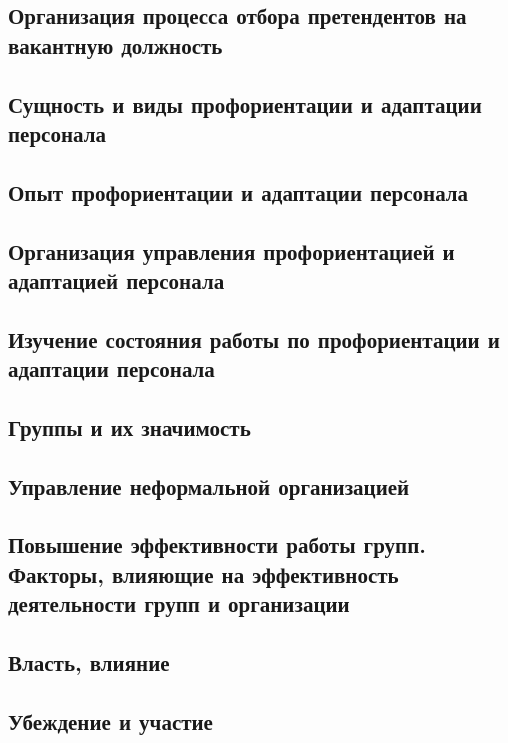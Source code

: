 \documentclass[a4paper,12pt,oneside,final]{extarticle}
\numberwithin{equation}{section}
\begin{document}
\subsection{Организация процесса отбора претендентов на вакантную должность}

\subsection{Сущность и виды профориентации и адаптации персонала}

\subsection{Опыт профориентации и адаптации персонала}

\subsection{Организация управления профориентацией и адаптацией персонала}

\subsection{Изучение состояния работы по профориентации и адаптации персонала}

\subsection{Группы и их значимость}

\subsection{Управление неформальной организацией }

\subsection{Повышение эффективности работы групп. Факторы, влияющие на эффективность деятельности групп и организации}

\subsection{Власть, влияние}

\subsection{Убеждение и участие}
\end{document}
